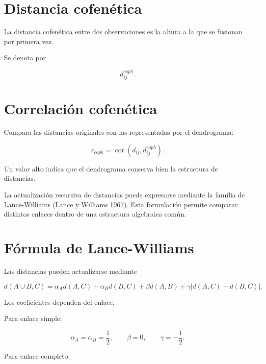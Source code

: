\documentclass[
  spanish,
  10.5pt,
  letterpaper,
  DIV=11,
  numbers=noendperiod,
  oneside,
  open=any]{scrreprt}
\theoremstyle{definition}
\theoremstyle{definition}
\theoremstyle{plain}
\theoremstyle{remark}
\begin{document}
\section*{Distancia cofenética}\label{distancia-cofenuxe9tica}


La distancia cofenética entre dos observaciones es la altura a la que se
fusionan por primera vez.

Se denota por

\[
d_{ij}^{coph}.
\]

\section*{Correlación cofenética}\label{correlaciuxf3n-cofenuxe9tica}


Compara las distancias originales con las representadas por el
dendrograma:

\[
r_{coph}
=
\operatorname{cor}
\left(
d_{ij},
d_{ij}^{coph}
\right).
\]

Un valor alto indica que el dendrograma conserva bien la estructura de
distancias.

La actualización recursiva de distancias puede expresarse mediante la
familia de Lance-Williams (Lance y Williams 1967). Esta formulación
permite comparar distintos enlaces dentro de una estructura algebraica
común.

\section*{Fórmula de Lance-Williams}\label{fuxf3rmula-de-lance-williams}


Las distancias pueden actualizarse mediante

\[
d(A\cup B,C)
=
\alpha_A d(A,C)
+
\alpha_B d(B,C)
+
\beta d(A,B)
+
\gamma
|d(A,C)-d(B,C)|.
\]

Los coeficientes dependen del enlace.

Para enlace simple:

\[
\alpha_A=\alpha_B=\frac{1}{2},
\qquad
\beta=0,
\qquad
\gamma=-\frac{1}{2}.
\]

Para enlace completo:
\end{document}
